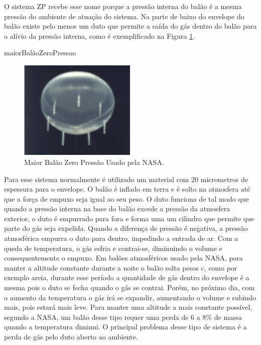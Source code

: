	O sistema ZP recebe esse nome porque a pressão interna do balão é a mesma  pressão do ambiente de atuação do sistema. Na parte de baixo do envelope do balão existe pelo menos um duto que permite a saída do gás dentro do balão para o alívio da pressão interna, como é exemplificado na Figura \ref{img:maiorBalaoZeroPressao}.

	maiorBalãoZeroPressao

	\begin{figure}[H]
		\centering
		\includegraphics[width=0.5\textwidth]{figuras/maiorBalaoZeroPressao}
		\caption{Maior Balão Zero Pressão Usado pela NASA.}
		\label{img:maiorBalaoZeroPressao}
	\end{figure}

	Para esse sistema normalmente é utilizado um material com 20 micrometros de espessura para o envelope. O balão é inflado em terra e é solto na atmosfera até que a força de empuxo seja igual ao seu peso. O duto funciona de tal modo que quando a pressão interna na base do balão excede a pressão da atmosfera exterior, o duto é empurrado para fora e forma uma um cilindro que permite que parte do gás seja expelida. Quando a diferença de pressão é negativa, a pressão atmosférica empurra o duto para dentro, impedindo a entrada de ar. Com a queda de temperatura, o gás esfria e contrai-se, diminuindo o volume e consequentemente o empuxo. Em balões atmosféricos usado pela NASA, para manter a altitude constante durante a noite o balão solta pesos c, como por exemplo areia, durante esse período a quantidade de gás dentro do envelope é a mesma pois o duto se fecha quando o gás se contrai. Porém, no próximo dia, com o aumento da temperatura o gás irá se expandir, aumentando o volume e subindo mais, pois estará mais leve. Para manter uma altitude a mais constante possível, segundo a NASA, um balão desse tipo requer uma perda de 6 a 8\% de massa quando a temperatura diminui. O principal problema desse tipo de sistema é a perda de gás pelo duto aberto ao ambiente. 

